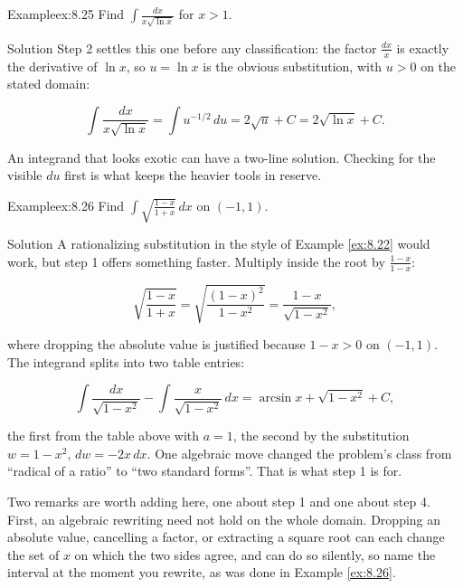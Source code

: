 \documentclass[a4paper,12pt,oneside]{memoir}
\begin{document}
\begin{workedexample}
\begin{envexample}{Example}{ex:8.25}{}
Find \(\displaystyle\int \frac{dx}{x\sqrt{\ln x}}\) for \(x > 1\).
\end{envexample}
\begin{envsolution}{Solution}{}{}
Step 2 settles this one before any classification: the factor \(\tfrac{dx}{x}\) is exactly the derivative of \(\ln x\), so \(u = \ln x\) is the obvious substitution, with \(u > 0\) on the stated domain:

\[ \int \frac{dx}{x\sqrt{\ln x}} = \int u^{-1/2}\,du = 2\sqrt{u} + C = 2\sqrt{\ln x} + C. \]

An integrand that looks exotic can have a two-line solution. Checking for the visible \(du\) first is what keeps the heavier tools in reserve. \qedmark
\end{envsolution}
\end{workedexample}
\begin{workedexample}
\begin{envexample}{Example}{ex:8.26}{}
Find \(\displaystyle\int \sqrt{\frac{1 - x}{1 + x}}\,dx\) on \((-1, 1)\).
\end{envexample}
\begin{envsolution}{Solution}{}{}
A rationalizing substitution in the style of Example \ref{ex:8.22} would work, but step 1 offers something faster. Multiply inside the root by \(\tfrac{1 - x}{1 - x}\):

\[ \sqrt{\frac{1 - x}{1 + x}} = \sqrt{\frac{(1 - x)^{2}}{1 - x^{2}}} = \frac{1 - x}{\sqrt{1 - x^{2}}}, \]

where dropping the absolute value is justified because \(1 - x > 0\) on \((-1, 1)\). The integrand splits into two table entries:

\[ \int \frac{dx}{\sqrt{1 - x^{2}}} - \int \frac{x}{\sqrt{1 - x^{2}}}\,dx = \arcsin x + \sqrt{1 - x^{2}} + C, \]

the first from the table above with \(a = 1\), the second by the substitution \(w = 1 - x^{2}\), \(dw = -2x\,dx\). One algebraic move changed the problem’s class from “radical of a ratio” to “two standard forms”. That is what step 1 is for. \qedmark
\end{envsolution}
\end{workedexample}
Two remarks are worth adding here, one about step 1 and one about step 4. First, an algebraic rewriting need not hold on the whole domain. Dropping an absolute value, cancelling a factor, or extracting a square root can each change the set of \(x\) on which the two sides agree, and can do so silently, so name the interval at the moment you rewrite, as was done in Example \ref{ex:8.26}.
\end{document}
